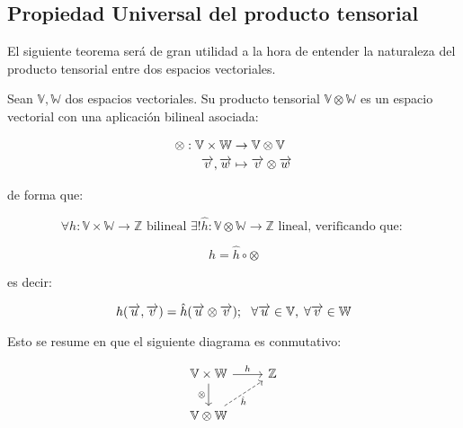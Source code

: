 \subsection{Propiedad Universal del producto tensorial}

El siguiente teorema será de gran utilidad a la hora de entender la naturaleza del producto tensorial entre dos espacios vectoriales.

\begin{teorema} Sean $\mathbb{V}, \mathbb{W}$ dos espacios vectoriales. Su producto tensorial $\mathbb{V} \otimes \mathbb{W}$ es un espacio vectorial con una aplicación bilineal asociada:

	\begin{equation}
		\begin{split}
			\otimes : \mathbb{V} \times \mathbb{W} &\to \mathbb{V} \otimes \mathbb{V} \\
			\overrightarrow{v}, \overrightarrow{w} & \mapsto \overrightarrow{v} \otimes \overrightarrow{w}
		\end{split}
	\end{equation}

	de forma que:

	\begin{equation}
		\forall h: \mathbb{V} \times \mathbb{W} \to \mathbb{Z} \text{  bilineal  } \exists! \hat{h}: \mathbb{V} \otimes \mathbb{W} \to \mathbb{Z} \text{  lineal, verificando que: }
	\end{equation}

	\begin{equation}
		h = \hat{h} \circ \otimes
	\end{equation}

	es decir:

	\begin{equation}
		h(\overrightarrow{u}, \overrightarrow{v}) = \hat{h}(\overrightarrow{u} \otimes \overrightarrow{v});
		\ \  \forall \overrightarrow{u} \in \mathbb{V}, \; \forall \overrightarrow{v} \in \mathbb{W}
	\end{equation}

	Esto se resume en que el siguiente diagrama es conmutativo:

	\begin{equation}
		\begin{tikzcd}
			\mathbb{V} \times \mathbb{W} \ar{r}{h} \ar{d}[left]{\otimes} & \mathbb{Z} \\
			\mathbb{V} \otimes \mathbb{W} \ar[dashed]{ur}[right, below]{\hat{h}}
		\end{tikzcd}
	\end{equation}

\end{teorema}

